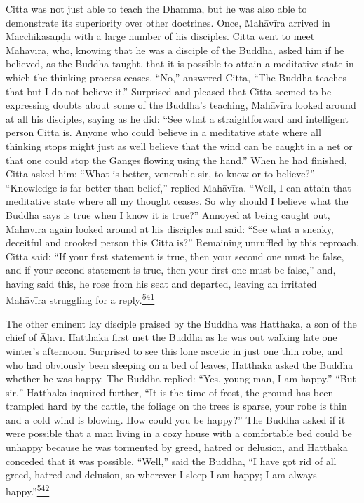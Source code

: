Citta was not just able to teach the Dhamma, but he was also able to
demonstrate its superiority over other doctrines. Once, Mahāvīra arrived
in Macchikāsaṇḍa with a large number of his disciples. Citta went to
meet Mahāvīra, who, knowing that he was a disciple of the Buddha, asked
him if he believed, as the Buddha taught, that it is possible to attain
a meditative state in which the thinking process ceases. ``No,''
answered Citta, ``The Buddha teaches that but I do not believe it.''
Surprised and pleased that Citta seemed to be expressing doubts about
some of the Buddha's teaching, Mahāvīra looked around at all his
disciples, saying as he did: ``See what a straightforward and
intelligent person Citta is. Anyone who could believe in a meditative
state where all thinking stops might just as well believe that the wind
can be caught in a net or that one could stop the Ganges flowing using
the hand.'' When he had finished, Citta asked him: ``What is better,
venerable sir, to know or to believe?'' ``Knowledge is far better than
belief,'' replied Mahāvīra. ``Well, I can attain that meditative state
where all my thought ceases. So why should I believe what the Buddha
says is true when I know it is true?'' Annoyed at being caught out,
Mahāvīra again looked around at his disciples and said: ``See what a
sneaky, deceitful and crooked person this Citta is?'' Remaining
unruffled by this reproach, Citta said: ``If your first statement is
true, then your second one must be false, and if your second statement
is true, then your first one must be false,'' and, having said this, he
rose from his seat and departed, leaving an irritated Mahāvīra
struggling for a
reply.\label{footprints_split_014.html_fnref541}\hyperref[footprints_split_025.htmlux5cux23fn541]{\textsuperscript{541}}

The other eminent lay disciple praised by the Buddha was Hatthaka, a son
of the chief of Āḷavī. Hatthaka first met the Buddha as he was out
walking late one winter's afternoon. Surprised to see this lone ascetic
in just one thin robe, and who had obviously been sleeping on a bed of
leaves, Hatthaka asked the Buddha whether he was happy. The Buddha
replied: ``Yes, young man, I am happy.'' ``But sir,'' Hatthaka inquired
further, ``It is the time of frost, the ground has been trampled hard by
the cattle, the foliage on the trees is sparse, your robe is thin and a
cold wind is blowing. How could you be happy?'' The Buddha asked if it
were possible that a man living in a cozy house with a comfortable bed
could be unhappy because he was tormented by greed, hatred or delusion,
and Hatthaka conceded that it was possible. ``Well,'' said the Buddha,
``I have got rid of all greed, hatred and delusion, so wherever I sleep
I am happy; I am always
happy.''\label{footprints_split_014.html_fnref542}\hyperref[footprints_split_025.htmlux5cux23fn542]{\textsuperscript{542}}

